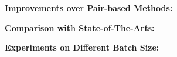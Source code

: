 \documentclass[landscape,a0paper,fontscale=0.292]{baposter}
\begin{document}
\begin{poster}
{   \vspace{1.0em}
    \begin{minipage}{0.44\linewidth}
        \centering
        \textbf{\color{blue}Improvements over Pair-based Methods:}

        \vspace{0.2em}
        
    \end{minipage}
    \begin{minipage}{0.52\linewidth}
        \centering
        \textbf{\color{blue}Comparison with State-of-The-Arts:}

        \vspace{0.2em}
        
    \end{minipage}

    \vspace{1.0em}
    \begin{minipage}{.66\linewidth}
        \centering
        \textbf{\color{blue}Experiments on Different Batch Size:}


\end{minipage}}
\end{poster}
\end{document}
